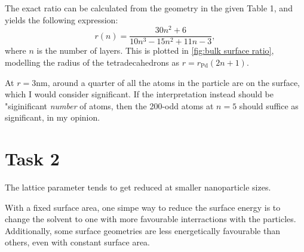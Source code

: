     The exact ratio can be calculated from the geometry in the given Table 1,
    and yields the following expression:
    $$
    r(n) = \frac{30n^2 + 6}{10n^3 -15n^2 + 11n -3},
    $$
    where $n$ is the number of layers. 
    This is plotted in \autoref{fig:bulk surface ratio}, 
    modelling the radius of the tetradecahedrons as 
    $r = r_\text{Pd}\left(2n + 1\right)$.

    At $r = 3\si{\nano\metre}$, around a quarter of 
    all the atoms in the particle are on the surface, which I
    would consider significant. If the interpretation instead should
    be "siginificant \textit{number} of atoms, then the 200-odd atoms at 
    $n = 5$ should suffice as significant, in my opinion.

\section{Task 2}
    The lattice parameter tends to get reduced at smaller nanoparticle
    sizes. 

    With a fixed surface area, one simpe way to reduce the surface
    energy is to change the solvent to one with more favourable 
    interractions with the particles. Additionally, some surface 
    geometries are less energetically favourable than others, 
    even with constant surface area. 
    
